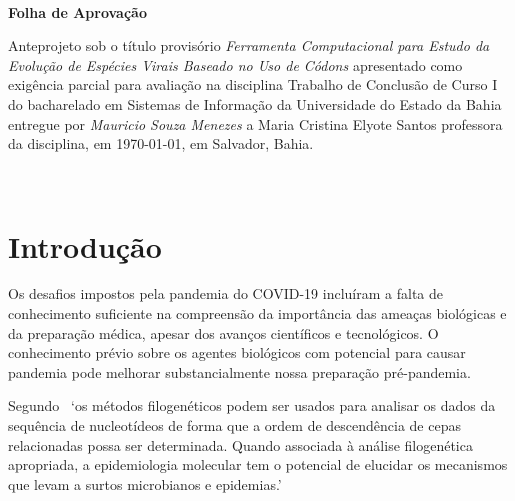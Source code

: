\documentclass[font=plain]{abnt}
\begin{document}

\capa\
\folhaderosto\
\begin{folhadeaprovacao}
    \begin{center}
        \large
        \textbf{Folha de Aprovação}
    \end{center}

    Anteprojeto sob o título provisório \textit{Ferramenta Computacional para Estudo da Evolução de Espécies Virais Baseado no Uso de Códons} apresentado como exigência parcial para avaliação na disciplina Trabalho de Conclusão de Curso I do bacharelado em Sistemas de Informação da Universidade do Estado da Bahia entregue por \textit{Mauricio Souza Menezes} a Maria Cristina Elyote Santos professora da disciplina, em \today, em Salvador, Bahia.
    \setlength{\ABNTsignthickness}{0.4pt}
    \setlength{\ABNTsignskip}{2cm}
    \hspace*{1cm}
    \hspace*{1cm}
    \assinatura{Diego Gervasio Frias Suárez}
\end{folhadeaprovacao}




\sumario\


\chapter{Introdução}

Os desafios impostos pela pandemia do COVID-19 incluíram a falta de conhecimento suficiente na compreensão da importância das ameaças biológicas e da preparação médica, apesar dos avanços científicos e tecnológicos. O conhecimento prévio sobre os agentes biológicos com potencial para causar pandemia pode melhorar substancialmente nossa preparação pré-pandemia.~\cite[p. 1]{behl_threat_2022}

Segundo~\cite[p.1]{barry_phylogenetic_analysis_2006} `os métodos filogenéticos podem ser usados para analisar os dados da sequência de nucleotídeos de forma que a ordem de descendência de cepas relacionadas possa ser determinada. Quando associada à análise filogenética apropriada, a epidemiologia molecular tem o potencial de elucidar os mecanismos que levam a surtos microbianos e epidemias.'
\end{document}
